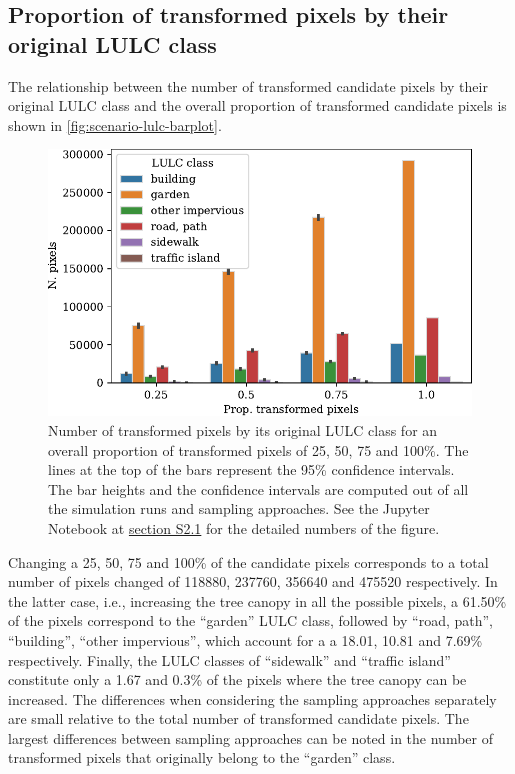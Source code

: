 \documentclass[10pt,letterpaper]{article}
\begin{document}
\subsection*{Proportion of transformed pixels by their original LULC class}

The relationship between the number of transformed candidate pixels by their original LULC class and the overall proportion of transformed candidate pixels is shown in \autoref{fig:scenario-lulc-barplot}.
\begin{figure}
  \centering
  \includegraphics[width=.6\textwidth]{figures/scenario-lulc-barplot}%
  \caption{\label{fig:scenario-lulc-barplot} Number of transformed pixels by its original LULC class for an overall proportion of transformed pixels of 25, 50, 75 and 100\%. The lines at the top of the bars represent the 95\% confidence intervals. The bar heights and the confidence intervals are computed out of all the simulation runs and sampling approaches. See the Jupyter Notebook at \hyperref[sec:si-scenarios]{section S2.1} for the detailed numbers of the figure.}
\end{figure}
Changing a 25, 50, 75 and 100\% of the candidate pixels corresponds to a total number of pixels changed of 118880, 237760, 356640 and 475520 respectively.
In the latter case, i.e., increasing the tree canopy in all the possible pixels, a 61.50\% of the pixels correspond to the ``garden'' LULC class, followed by ``road, path'', ``building'', ``other impervious'', which account for a a 18.01, 10.81 and 7.69\% respectively. Finally, the LULC classes of ``sidewalk'' and ``traffic island'' constitute only a 1.67 and 0.3\% of the  pixels where the tree canopy can be increased.
The differences when considering the sampling approaches separately are small relative to the total number of transformed candidate pixels.
The largest differences between sampling approaches can be noted in the number of transformed pixels that originally belong to the ``garden'' class.
\end{document}
